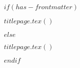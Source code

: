 $if(has-frontmatter)$
  \begin{frontmatter}
  \begin{titlepage}
  $titlepage.tex()$

  \end{titlepage}

  \end{frontmatter}
$else$
  \begin{titlepage}
  $titlepage.tex()$

  \end{titlepage}
$endif$


